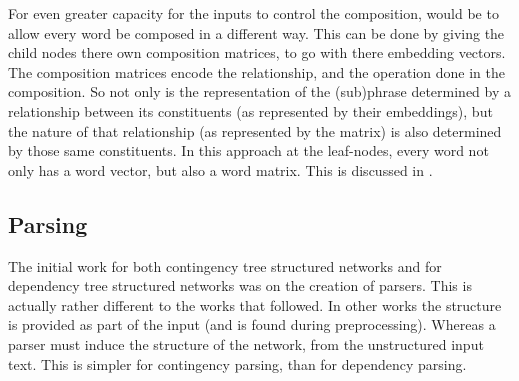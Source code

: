 \documentclass[12pt,parskip]{komatufte}
\begin{document}
For even greater capacity for the inputs to control the composition,
would be to allow every word be composed in a different way.
This can be done by giving the child nodes there own composition matrices, to go with there embedding vectors.
The composition matrices encode the relationship, and the operation done in the composition.
So not only is the representation of the (sub)phrase determined by a relationship between  its constituents (as represented by their embeddings),
but the nature of that relationship (as represented by the matrix) is also determined by those same constituents.
In this approach at the leaf-nodes, every word not only has a word vector, but also a word matrix.
This is discussed in .



\subsection{Parsing} \label{sec:parsing}

The initial work for both contingency tree structured networks  \parencite{socher2010PhraseEmbedding} and for dependency tree structured networks  was on the creation of parsers.
This is actually rather different to the works that followed.
In other works the structure is provided as part of the input (and is found during preprocessing).
Whereas a parser must induce the structure of the network,
from the unstructured input text.
This is simpler for contingency parsing, than for dependency parsing.


\end{document}
